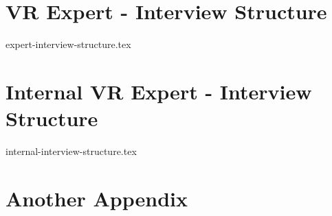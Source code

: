 
\appendix
\chapter{VR Expert - Interview Structure}
\label{appendix:ex-interview-structure}
{expert-interview-structure.tex}


\chapter{Internal VR Expert - Interview Structure}
\label{appendix:in-interview-structure}
{internal-interview-structure.tex}

\chapter{Another Appendix}
\label{appendix:other}

